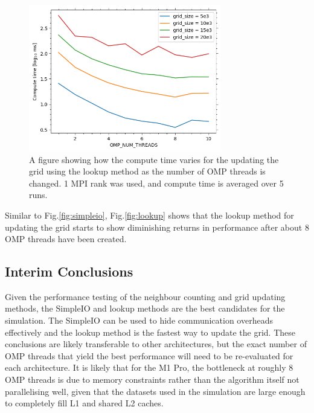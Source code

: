     \begin{figure}[htb]
    \centering
    \includegraphics[width=0.75\textwidth]{./figures/lookup}
    \caption{A figure showing how the compute time varies for the updating the grid using the lookup method as the number
        of OMP threads is changed.
        1 MPI rank was used, and compute time is averaged over 5 runs.}
    \label{fig:lookup}
    \end{figure}

    Similar to Fig.\eqref{fig:simpleio}, Fig.\eqref{fig:lookup} shows that the lookup method for updating the grid starts
    to show diminishing returns in performance after about 8 OMP threads have been created.

    \subsection{Interim Conclusions}\label{subsec:interim-conclusions}
    Given the performance testing of the neighbour counting and grid updating methods, the SimpleIO and lookup methods
    are the best candidates for the simulation.
    The SimpleIO can be used to hide communication overheads effectively and the lookup method is the fastest way to
    update the grid.
    These conclusions are likely transferable to other architectures, but the exact number of OMP threads that yield
    the best performance will need to be re-evaluated for each architecture.
    It is likely that for the M1 Pro, the bottleneck at roughly 8 OMP threads is due to memory constraints rather
    than the algorithm itself not parallelising well, given that the datasets used in the simulation are large enough
    to completely fill L1 and shared L2 caches.






